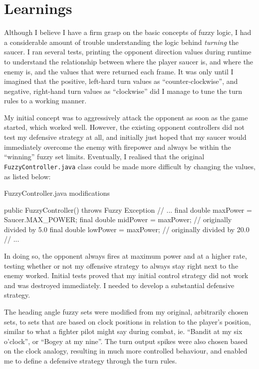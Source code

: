 \newpage

\section{Learnings}

Although I believe I have a firm grasp on the basic concepts of fuzzy logic, I had a considerable amount of trouble understanding the logic behind \emph{turning} the saucer. I ran several tests, printing the opponent direction values during runtime to understand the relationship between where the player saucer is, and where the enemy is, and the values that were returned each frame. It was only until I imagined that the positive, left-hard turn values as ``counter-clockwise'', and negative, right-hand turn values as ``clockwise'' did I manage to tune the turn rules to a working manner.

My initial concept was to aggressively attack the opponent as soon as the game started, which worked well. However, the existing opponent controllers did not test my defensive strategy at all, and initially just hoped that my saucer would immediately overcome the enemy with firepower and always be within the ``winning'' fuzzy set limits. Eventually, I realised that the original \texttt{FuzzyController.java} class could be made more difficult by changing the values, as listed below:

\begin{listing}[H]
\caption{FuzzyController.java modifications}

\begin{javacode}
public FuzzyController() throws Fuzzy Exception {
  // ...
  final double maxPower = Saucer.MAX_POWER;
  final double midPower = maxPower; // originally divided by 5.0
  final double lowPower = maxPower; // originally divided by 20.0
  // ...
}
\end{javacode}
\end{listing}

In doing so, the opponent always fires at maximum power and at a higher rate, testing whether or not my offensive strategy to always stay right next to the enemy worked. Initial tests proved that my initial control strategy did not work and was destroyed immediately. I needed to develop a substantial defensive strategy.

The heading angle fuzzy sets were modified from my original, arbitrarily chosen sets, to sets that are based on clock positions in relation to the player's position, similar to what a fighter pilot might say during combat, ie. ``Bandit at my six o'clock'', or ``Bogey at my nine''. The turn output spikes were also chosen based on the clock analogy, resulting in much more controlled behaviour, and enabled me to define a defensive strategy through the turn rules.

